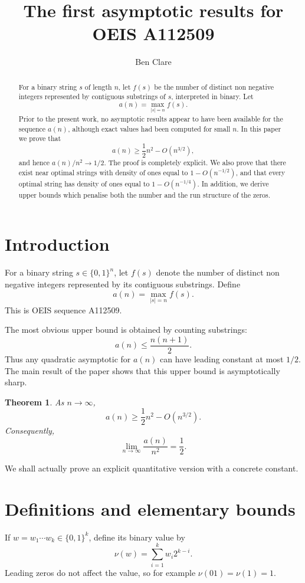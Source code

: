 \documentclass[11pt]{article}
\title{The first asymptotic results for OEIS A112509}
\author{Ben Clare}
\date{}
\newtheorem{theorem}{Theorem}
\newcommand{\val}{\nu}
\begin{document}
\maketitle

\begin{abstract}
For a binary string $s$ of length $n$, let $f(s)$ be the number of distinct non negative integers represented by contiguous substrings of $s$, interpreted in binary.  Let
\[
a(n)=\max_{|s|=n} f(s).
\]
Prior to the present work, no asymptotic results appear to have been available for the sequence $a(n)$, although exact values had been computed for small $n$.  In this paper we prove that
\[
a(n)\ge \frac12 n^2-O(n^{3/2}),
\]
and hence $a(n)/n^2\to 1/2$.  The proof is completely explicit.  We also prove that there exist near optimal strings with density of ones equal to $1-O(n^{-1/2})$, and that every optimal string has density of ones equal to $1-O(n^{-1/4})$.  In addition, we derive upper bounds which penalise both the number and the run structure of the zeros.
\end{abstract}

\section{Introduction}

For a binary string $s\in\{0,1\}^n$, let $f(s)$ denote the number of distinct non negative integers represented by its contiguous substrings.  Define
\[
a(n)=\max_{|s|=n} f(s).
\]
This is OEIS sequence A112509.

The most obvious upper bound is obtained by counting substrings:
\[
a(n)\le \frac{n(n+1)}{2}.
\]
Thus any quadratic asymptotic for $a(n)$ can have leading constant at most $1/2$.  The main result of the paper shows that this upper bound is asymptotically sharp.

\begin{theorem}\label{thm:main-asymptotic}
As $n\to\infty$,
\[
a(n)\ge \frac12 n^2-O(n^{3/2}).
\]
Consequently,
\[
\lim_{n\to\infty} \frac{a(n)}{n^2}=\frac12.
\]
\end{theorem}

We shall actually prove an explicit quantitative version with a concrete constant.

\section{Definitions and elementary bounds}

If $w=w_1\cdots w_k\in\{0,1\}^k$, define its binary value by
\[
\val(w)=\sum_{i=1}^k w_i 2^{k-i}.
\]
Leading zeros do not affect the value, so for example $\val(01)=\val(1)=1$.
\end{document}
